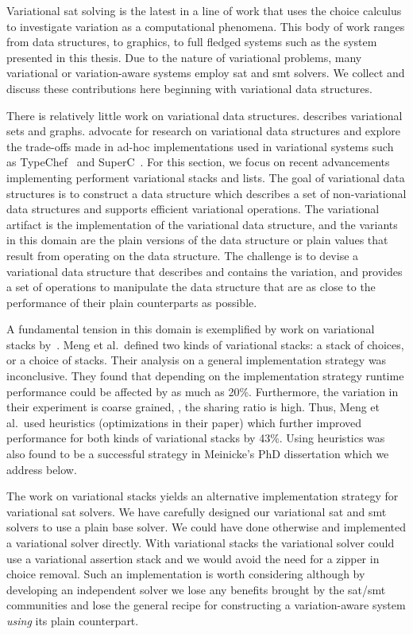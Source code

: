 \label{section:related-work:variational-systems}
%
Variational \ac{sat} solving is the latest in a line of work that uses the
choice calculus to investigate variation as a computational phenomena. This body
of work ranges from data structures, to graphics, to full fledged systems such
as the system presented in this thesis. Due to the nature of variational
problems, many variational or variation-aware systems employ \ac{sat} and
\ac{smt} solvers. We collect and discuss these contributions here beginning with
variational data structures.

There is relatively little work on variational data structures.
\citet{EWC13fosd} describes variational sets and graphs. \citet{Walk14onward}
advocate for research on variational data structures and explore the trade-offs
made in ad-hoc implementations used in variational systems such as
TypeChef~\cite{KKHL:FOSD10} and SuperC~\cite{GG:PLDI12}. For this section, we
focus on recent advancements implementing performent variational stacks and
lists. The goal of variational data structures is to construct a data structure
which describes a set of non-variational data structures and supports efficient
variational operations. The variational artifact is the implementation of the
variational data structure, and the variants in this domain are the plain
versions of the data structure or plain values that result from operating on the
data structure. The challenge is to devise a variational data structure that
describes and contains the variation, and provides a set of operations to
manipulate the data structure that are as close to the performance of their
plain counterparts as possible.

A fundamental tension in this domain is exemplified by work on variational
stacks by~\citet{MMWWK17vamos}. Meng et al.\ defined two kinds of variational
stacks: a stack of choices, or a choice of stacks. Their analysis on a general
implementation strategy was inconclusive. They found that depending on the
implementation strategy runtime performance could be affected by as much as
20\%. Furthermore, the variation in their experiment is coarse grained, \ie{},
the sharing ratio is high. Thus, Meng et al.\ used heuristics (optimizations in
their paper) which further improved performance for both kinds of variational
stacks by 43\%. Using heuristics was also found to be a successful strategy in
Meinicke's PhD dissertation which we address below.

The work on variational stacks yields an alternative implementation strategy for
variational \ac{sat} solvers. We have carefully designed our variational
\ac{sat} and \ac{smt} solvers to use a plain base solver. We could have done
otherwise and implemented a variational solver directly. With variational stacks
the variational solver could use a variational assertion stack and we would
avoid the need for a zipper in choice removal. Such an implementation is worth
considering although by developing an independent solver we lose any benefits
brought by the \ac{sat}/\ac{smt} communities and lose the general recipe for
constructing a variation-aware system \emph{using} its plain counterpart.

